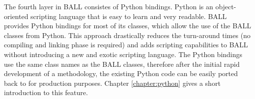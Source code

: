 The fourth layer in BALL consistes of Python bindings. Python is an
object-oriented scripting language that is easy to learn and very readable.
BALL provides Python bindings for most of its classes, which allow the use of
the BALL \CPP classes from Python. This approach drastically reduces the
turn-around times (no compiling and linking phase is required) and adds
scripting capabilities to BALL without introducing a new and exotic scripting
language. The Python bindings use the same class names as the BALL classes,
therefore after the initial rapid development of a methodology, the existing
Python code can be easily ported back to \CPP for production purposes.
Chapter \ref{chapter:python} gives a short introduction to this feature.
